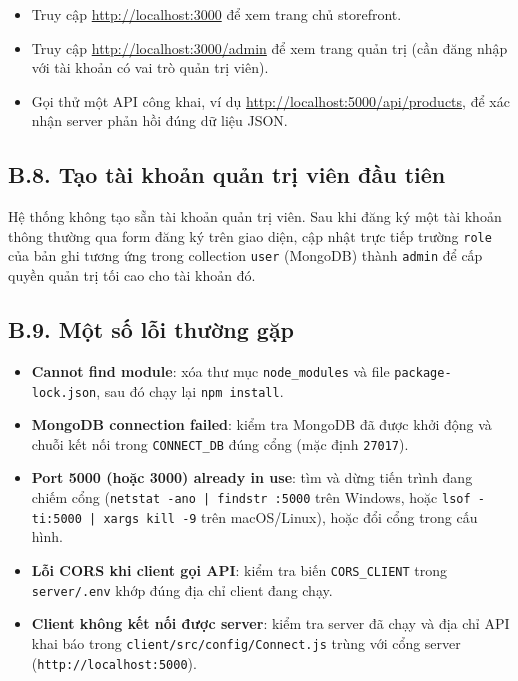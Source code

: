 \documentclass[../DoAn.tex]{subfiles}
\begin{document}
\begin{itemize}
  \item Truy cập \url{http://localhost:3000} để xem trang chủ storefront.
  \item Truy cập \url{http://localhost:3000/admin} để xem trang quản trị
        (cần đăng nhập với tài khoản có vai trò quản trị viên).
  \item Gọi thử một API công khai, ví dụ\newline
        \url{http://localhost:5000/api/products}, để xác nhận server phản
        hồi đúng dữ liệu JSON.
\end{itemize}

\subsection*{B.8. Tạo tài khoản quản trị viên đầu tiên}

Hệ thống không tạo sẵn tài khoản quản trị viên. Sau khi đăng ký một tài
khoản thông thường qua form đăng ký trên giao diện, cập nhật trực tiếp
trường \texttt{role} của bản ghi tương ứng trong collection \texttt{user}
(MongoDB) thành \texttt{admin} để cấp quyền quản trị tối cao cho tài khoản
đó.

\subsection*{B.9. Một số lỗi thường gặp}

\begin{itemize}
  \item \textbf{Cannot find module}: xóa thư mục \texttt{node\_modules} và
        file \break \texttt{package-lock.json}, sau đó chạy lại \texttt{npm install}.
  \item \textbf{MongoDB connection failed}: kiểm tra MongoDB đã được khởi
        động và chuỗi kết nối trong \texttt{CONNECT\_DB} đúng cổng (mặc định
        \texttt{27017}).
  \item \textbf{Port 5000 (hoặc 3000) already in use}: tìm và dừng tiến
        trình đang chiếm cổng (\texttt{netstat -ano | findstr :5000} trên
        Windows, hoặc \break \texttt{lsof -ti:5000 | xargs kill -9} trên
        macOS/Linux), hoặc đổi cổng trong cấu hình.
  \item \textbf{Lỗi CORS khi client gọi API}: kiểm tra biến \texttt{CORS\_CLIENT}
        trong \texttt{server/.env} khớp đúng địa chỉ client đang chạy.
  \item \textbf{Client không kết nối được server}: kiểm tra server đã chạy
        và địa chỉ API khai báo trong \texttt{client/src/config/Connect.js}
        trùng với cổng server (\texttt{http://localhost:5000}).
\end{itemize}
\end{document}
